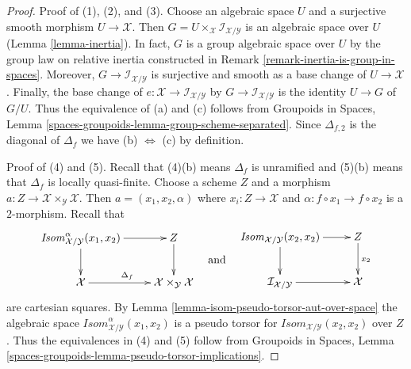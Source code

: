 \documentclass[10pt,a4paper]{amsart}
\theoremstyle{plain}
\theoremstyle{definition}
\theoremstyle{remark}
\numberwithin{equation}{subsection}
\begin{document}
\begin{proof}
Proof of (1), (2), and (3).
Choose an algebraic space $U$ and a surjective smooth morphism
$U \to \mathcal{X}$. Then
$G = U \times_\mathcal{X} \mathcal{I}_{\mathcal{X}/\mathcal{Y}}$
is an algebraic space over $U$ (Lemma \ref{lemma-inertia}).
In fact, $G$ is a group algebraic space over $U$
by the group law on relative
inertia constructed in Remark \ref{remark-inertia-is-group-in-spaces}.
Moreover, $G \to \mathcal{I}_{\mathcal{X}/\mathcal{Y}}$
is surjective and smooth as a base change of $U \to \mathcal{X}$.
Finally, the base change of
$e : \mathcal{X} \to \mathcal{I}_{\mathcal{X}/\mathcal{Y}}$
by $G \to \mathcal{I}_{\mathcal{X}/\mathcal{Y}}$
is the identity $U \to G$ of $G/U$.
Thus the equivalence of (a) and (c) follows from
Groupoids in Spaces, Lemma
\ref{spaces-groupoids-lemma-group-scheme-separated}.
Since $\Delta_{f, 2}$ is the diagonal of $\Delta_f$ we have
(b) $\Leftrightarrow$ (c) by definition.

\medskip\noindent
Proof of (4) and (5). Recall that (4)(b) means $\Delta_f$ is
unramified and (5)(b) means that $\Delta_f$ is locally quasi-finite.
Choose a scheme $Z$ and a morphism
$a : Z \to \mathcal{X} \times_\mathcal{Y} \mathcal{X}$.
Then $a = (x_1, x_2, \alpha)$ where $x_i : Z \to \mathcal{X}$
and $\alpha : f \circ x_1  \to f \circ x_2$ is a $2$-morphism.
Recall that
$$
\vcenter{
\xymatrix{
\mathit{Isom}_{\mathcal{X}/\mathcal{Y}}^\alpha(x_1, x_2)
\ar[d] \ar[r] &
Z \ar[d] \\
\mathcal{X} \ar[r]^{\Delta_f} &
\mathcal{X} \times_\mathcal{Y} \mathcal{X}
}
}
\quad\text{and}\quad
\vcenter{
\xymatrix{
\mathit{Isom}_{\mathcal{X}/\mathcal{Y}}(x_2, x_2)
\ar[d] \ar[r] &
Z \ar[d]^{x_2} \\
\mathcal{I}_{\mathcal{X}/\mathcal{Y}} \ar[r] &
\mathcal{X}
}
}
$$
are cartesian squares. By Lemma \ref{lemma-isom-pseudo-torsor-aut-over-space}
the
algebraic space $\mathit{Isom}_{\mathcal{X}/\mathcal{Y}}^\alpha(x_1, x_2)$
is a pseudo torsor for $\mathit{Isom}_{\mathcal{X}/\mathcal{Y}}(x_2, x_2)$
over $Z$. Thus the equivalences in (4) and (5) follow from
Groupoids in Spaces, Lemma
\ref{spaces-groupoids-lemma-pseudo-torsor-implications}.
\end{proof}
\end{document}
